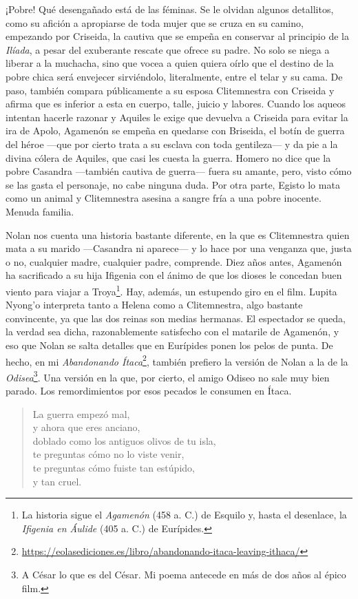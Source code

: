 ¡Pobre! Qué desengañado está de las féminas. Se le olvidan algunos detallitos, como su afición a apropiarse de toda mujer que se cruza en su camino, empezando por Criseida, la cautiva que se empeña en conservar al principio de la \emph{Ilíada}, a pesar del exuberante rescate que ofrece su padre. No solo se niega a liberar a la muchacha, sino que vocea a quien quiera oírlo que el destino de la pobre chica será envejecer sirviéndolo, literalmente, entre el telar y su cama. De paso, también compara públicamente a su esposa Clitemnestra con Criseida y afirma que es inferior a esta en cuerpo, talle, juicio y labores. Cuando los aqueos intentan hacerle razonar y Aquiles le exige que devuelva a Criseida para evitar la ira de Apolo, Agamenón se empeña en quedarse con Briseida, el botín de guerra del héroe ---que por cierto trata a su esclava con toda gentileza--- y da pie a la divina cólera de Aquiles, que casi les cuesta la guerra. Homero no dice que la pobre Casandra ---también cautiva de guerra--- fuera su amante, pero, visto cómo se las gasta el personaje, no cabe ninguna duda. Por otra parte, Egisto lo mata como un animal y Clitemnestra asesina a sangre fría a una pobre inocente. Menuda familia.

Nolan nos cuenta una historia bastante diferente, en la que es Clitemnestra quien mata a su marido ---Casandra ni aparece--- y lo hace por una venganza que, justa o no, cualquier madre, cualquier padre, comprende. Diez años antes, Agamenón ha sacrificado a su hija Ifigenia con el ánimo de que los dioses le concedan buen viento para viajar a Troya\footnote{La historia sigue el \emph{Agamenón} (458 a. C.) de Esquilo y, hasta el desenlace, la \emph{Ifigenia en Áulide} (405 a. C.) de Eurípides.}. Hay, además, un estupendo giro en el film. Lupita Nyong'o interpreta tanto a Helena como a Clitemnestra, algo bastante convincente, ya que las dos reinas son medias hermanas. El espectador se queda, la verdad sea dicha, razonablemente satisfecho con el matarile de Agamenón, y eso que Nolan se salta detalles que en Eurípides ponen los pelos de punta. De hecho, en mi \emph{Abandonando Ítaca}\footnote{\url{https://eolasediciones.es/libro/abandonando-itaca-leaving-ithaca/}}, también prefiero la versión de Nolan a la de la \emph{Odisea}\footnote{A César lo que es del César. Mi poema antecede en más de dos años al épico film.}. Una versión en la que, por cierto, el amigo Odiseo no sale muy bien parado. Los remordimientos por esos pecados le consumen en Ítaca.

\begin{verse}
La guerra empezó mal,\\
y ahora que eres anciano,\\
doblado como los antiguos olivos de tu isla,\\
te preguntas cómo no lo viste venir,\\
te preguntas cómo fuiste tan estúpido,\\
y tan cruel.
\end{verse}


